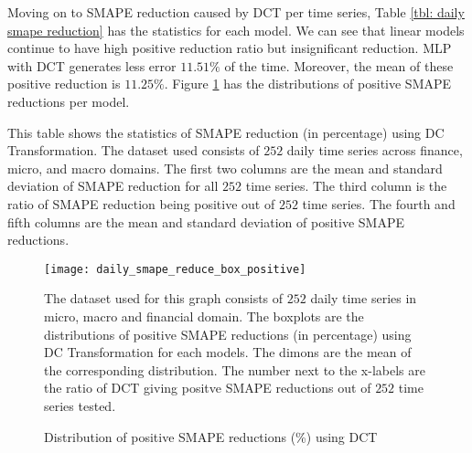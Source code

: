 Moving on to SMAPE reduction caused by DCT per time series, Table \ref{tbl: daily smape reduction} has the statistics for each model. We can see that linear models continue to have high positive reduction ratio but insignificant reduction. MLP with DCT generates less error $11.51\%$ of the time. Moreover, the mean of these positive reduction is $11.25\%$. Figure \ref{fig: daily positive smape reduce box} has the distributions of positive SMAPE reductions per model.
\begin{table}[H]
    \caption{Statistics of SMAPE reduction (\%) using DCT (daily cross-domain)}
    {\raggedright \footnotesize This table shows the statistics of SMAPE reduction (in percentage) using DC Transformation. The dataset used consists of $252$ daily time series across finance, micro, and macro domains. The first two columns are the mean and standard deviation of SMAPE reduction for all $252$ time series. The third column is the ratio of SMAPE reduction being positive out of $252$ time series. The fourth and fifth columns are the mean and standard deviation of positive SMAPE reductions. \par}
    \label{tbl: daily smape reduction}
\end{table}
\begin{figure}[H]
    \centering
    \texttt{[image: daily\_smape\_reduce\_box\_positive]}
    \caption{Distribution of positive SMAPE reductions (\%) using DCT}
    {\raggedright \footnotesize The dataset used for this graph consists of $252$ daily time series in micro, macro and financial domain. The boxplots are the distributions of positive SMAPE reductions (in percentage) using DC Transformation for each models. The dimons are the mean of the corresponding distribution. The number next to the x-labels are the ratio of DCT giving positve SMAPE reductions out of $252$ time series tested.\par}
    \label{fig: daily positive smape reduce box}
\end{figure}
